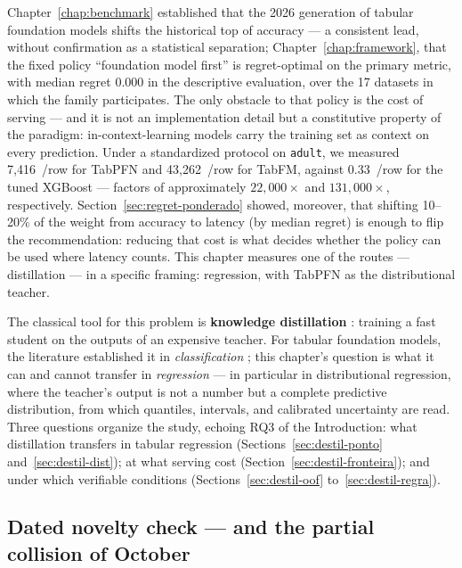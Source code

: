 Chapter~\ref{chap:benchmark} established that the 2026 generation of
tabular foundation models shifts the historical top of accuracy --- a
consistent lead, without confirmation as a statistical separation;
Chapter~\ref{chap:framework}, that the fixed policy ``foundation
model first'' is regret-optimal on the primary metric, with median
regret 0.000 in the descriptive evaluation, over the 17 datasets in
which the family participates. The only obstacle to that policy is
the cost of serving --- and it is not an implementation detail but a
constitutive property of the paradigm: in-context-learning models
carry the training set as context on every prediction. Under a
standardized protocol on \texttt{adult}, we measured 7{,}416~\us/row
for TabPFN and 43{,}262~\us/row for TabFM, against 0.33~\us/row for
the tuned XGBoost --- factors of approximately $22{,}000\times$ and
$131{,}000\times$, respectively.
Section~\ref{sec:regret-ponderado} showed, moreover, that shifting
10--20\% of the weight from accuracy to latency (by median regret)
is enough to flip the
recommendation: reducing that cost is what decides whether the policy
can be used where latency counts. This chapter measures one of the
routes --- distillation --- in a specific framing: regression, with
TabPFN as the distributional teacher.

The classical tool for this problem is \textbf{knowledge
distillation} \citep{bucila2006,hinton2015}: training a fast student
on the outputs of an expensive teacher. For tabular foundation
models, the literature established it in \emph{classification}
\citep{pocketfm2026}; this chapter's question is what it can and
cannot transfer in \emph{regression} --- in particular in
distributional regression, where the teacher's output is not a
number but a complete predictive distribution, from which quantiles,
intervals, and calibrated uncertainty are read. Three questions
organize the study, echoing RQ3 of the Introduction: what
distillation transfers in tabular regression
(Sections~\ref{sec:destil-ponto} and~\ref{sec:destil-dist}); at what
serving cost (Section~\ref{sec:destil-fronteira}); and under which
verifiable conditions (Sections~\ref{sec:destil-oof}
to~\ref{sec:destil-regra}).

\subsection{Dated novelty check --- and the partial collision of October}
\label{sec:destil-novidade}

